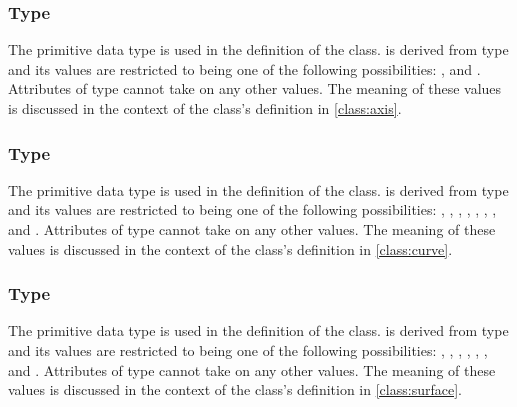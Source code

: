\begin{blockChanged}
\subsubsection[\element{AxisKind}]{Type }
\label{type:axisKind}

The  primitive data type is used in the definition of the \Axis class.   is derived from type  and its values are restricted to being one of the following possibilities: , and .  Attributes of type  cannot take on any other values.  The meaning of these values is discussed in the context of the \Axis class's definition in \ref{class:axis}.

\subsubsection[\element{CurveKind}]{Type }
\label{type:curveKind}

The  primitive data type is used in the definition of the \Curve class.   is derived from type  and its values are restricted to being one of the following possibilities: , , , , , , , and .  Attributes of type  cannot take on any other values.  The meaning of these values is discussed in the context of the \Curve class's definition in \ref{class:curve}.

\subsubsection[\element{SurfaceKind}]{Type }
\label{type:surfaceKind}

The  primitive data type is used in the definition of the \Surface class.   is derived from type  and its values are restricted to being one of the following possibilities: , , , , , , and .  Attributes of type  cannot take on any other values.  The meaning of these values is discussed in the context of the \Surface class's definition in \ref{class:surface}.


\end{blockChanged}


